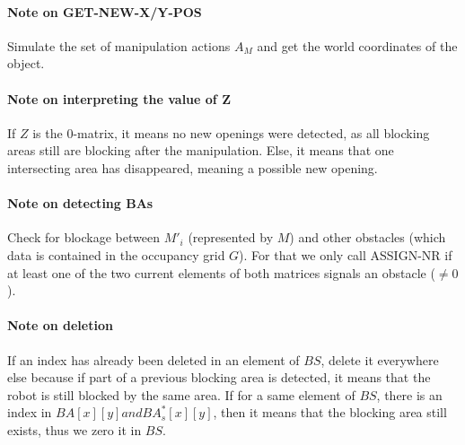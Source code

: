 \paragraph{Note on GET-NEW-X/Y-POS}\label{x-y-pos_note} Simulate the set of manipulation actions $A_{M}$ and get the world coordinates of the object.

\paragraph{Note on interpreting the value of Z}\label{interpreting_z_note} If $Z$ is the 0-matrix, it means no new openings were detected, as all blocking areas still are blocking after the manipulation. Else, it means that one intersecting area has disappeared, meaning a possible new opening.

\paragraph{Note on detecting BAs}\label{check_blockage_note} Check for blockage between $M'_{i}$ (represented by $M$) and other obstacles (which data is contained in the occupancy grid $G$). For that we only call ASSIGN-NR if at least one of the two current elements of both matrices signals an obstacle ($\neq 0$).

\paragraph{Note on deletion}\label{deletion_note} If an index has already been deleted in an element of $BS$, delete it everywhere else because if part of a previous blocking area is detected, it means that the robot is still blocked by the same area. If for a same element of $BS$, there is an index in $BA[x][y] and BA^*_{s}[x][y]$, then it means that the blocking area still exists, thus we zero it in $BS$.



\clearpage


